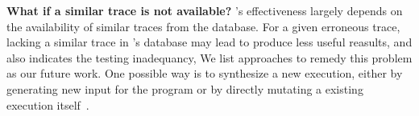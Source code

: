 \vspace{1mm}
\noindent \textbf{What if a similar trace is not available?}
\ourtool's effectiveness largely depends on the availability of
similar traces from the database. For a given erroneous trace, lacking a similar
trace in \ourtool's database may lead \ourtool to produce
less useful reasults, and also indicates the testing inadequancy,
We list approaches to remedy this problem as our future work. One
possible way is to synthesize a new execution, either by
generating new input for the program or by directly mutating a
existing execution itself~\cite{sumnerICSE2011}.




